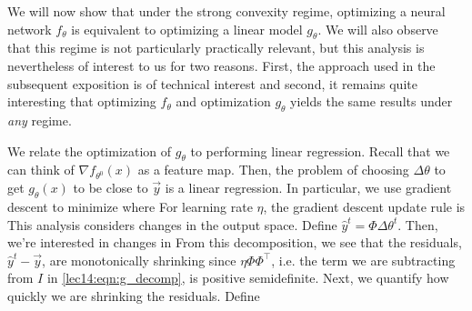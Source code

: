 We will now show that under the strong convexity regime, optimizing a neural network $f_\theta$ is equivalent to optimizing a linear model $g_\theta$. We will also observe that this regime is not particularly practically relevant, but this analysis is nevertheless of interest to us for two reasons. First, the approach used in the subsequent exposition is of technical interest and second, it remains quite interesting that optimizing $f_\theta$ and optimization $g_\theta$ yields the same results under \emph{any} regime. 

We relate the optimization of $g_\theta$ to performing linear regression. Recall that we can think of $\nabla f_{\theta^0}(x)$ as a feature map. Then, the problem of choosing $\Delta \theta$ to get $g_\theta(x)$ to be close to $\vec{y}$ is a linear regression. In particular, we use gradient descent to minimize
where 
For learning rate $\eta$, the gradient descent update rule is 
This analysis considers changes in the output space. Define $\hat{y}^t = \Phi \Delta \theta^t$. Then, we're interested in changes in 
From this decomposition, we see that the residuals, $\hat{y}^t - \vec{y}$, are monotonically shrinking since $\eta \Phi \Phi^\top$, i.e. the term we are subtracting from $I$ in \eqref{lec14:eqn:g_decomp}, is positive semidefinite. Next, we quantify how quickly we are shrinking the residuals. Define 
